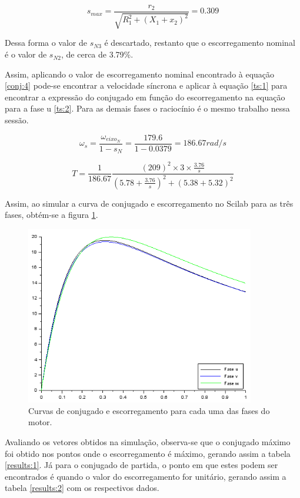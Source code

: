 \begin{equation} \label{conj:8}
s_{max} = \frac{r_2}{\sqrt{R_{1}^2+(X_1+x_2)^2}} = 0.309
\end{equation}

Dessa forma o valor de $s_{N3}$ é descartado, restanto que o escorregamento nominal é o valor de $s_{N2}$, de cerca de 3.79\%.

Assim, aplicando o valor de escorregamento nominal encontrado à equação \ref{conj:4} pode-se encontrar a velocidade síncrona e aplicar à equação \ref{ts:1} para encontrar a expressão do conjugado em função do escorregamento na equação para a fase u \ref{ts:2}. Para as demais fases o raciocínio é o mesmo trabalho nessa sessão.

\begin{equation} \label{conj:9}
\omega_s= \frac{\omega_{eixo_N}}{1-s_N} = \frac{179.6}{1-0.0379} = 186.67 rad/s
\end{equation}

\begin{equation} \label{ts:2}
T=\frac{1}{186.67}\frac{(209)^2\times3\times\frac{3.76}{s}}{\left(5.78+\frac{3.76}{s}\right)^2+(5.38+5.32)^2} 
\end{equation}

Assim, ao simular a curva de conjugado e escorregamento no Scilab para as três fases, obtém-se a figura \ref{curv:1}. 

\begin{figure}[H]
\centering
    \includegraphics[width=10cm]{images/ts1.png}  
\caption{Curvas de conjugado e escorregamento para cada uma das fases do motor.}
\label{curv:1} 
\end{figure}

Avaliando os vetores obtidos na simulação, observa-se que o conjugado máximo foi obtido nos pontos onde o escorregamento é máximo, gerando assim a tabela \ref{results:1}. Já para o conjugado de partida, o ponto em que estes podem ser encontrados é quando o valor do escorregamento for unitário, gerando assim a tabela \ref{results:2} com os respectivos dados.

